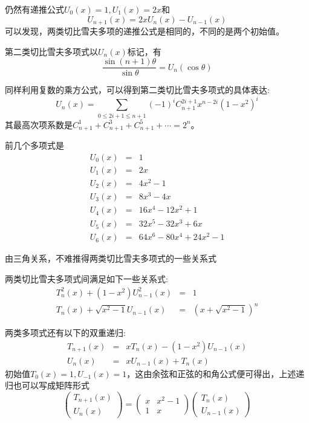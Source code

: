 仍然有递推公式$U_0(x)=1, U_1(x)=2x$和
\begin{equation*}
  U_{n+1}(x)=2xU_n(x)-U_{n-1}(x)
\end{equation*}
可以发现，两类切比雪夫多项的递推公式是相同的，不同的是两个初始值。

第二类切比雪夫多项式以$U_n(x)$标记，有
\begin{equation*}
  \frac{\sin{(n+1)\theta}}{\sin{\theta}} = U_n(\cos{\theta})
\end{equation*}

同样利用复数的乘方公式，可以得到第二类切比雪夫多项式的具体表达:
\begin{equation*}
  U_n(x) = \sum_{0 \leqslant 2i+1 \leqslant n+1}(-1)^iC_{n+1}^{2i+1}x^{n-2i}(1-x^2)^{i}
\end{equation*}
其最高次项系数是$C_{n+1}^1+C_{n+1}^3+C_{n+1}^5+\cdots=2^n$。

前几个多项式是
\begin{eqnarray*}
  U_0(x) & = & 1 \\
  U_1(x) & = & 2x \\
  U_2(x) & = & 4x^2-1 \\
  U_3(x) & = & 8x^3-4x \\
  U_4(x) & = & 16x^4-12x^2+1 \\
  U_5(x) & = & 32x^5-32x^3+6x \\
  U_6(x) & = & 64x^6-80x^4+24x^2-1
\end{eqnarray*}

由三角关系，不难推得两类切比雪夫多项式的一些关系式
\begin{property}
  两类切比雪夫多项式间满足如下一些关系式:
  \begin{eqnarray*}
    T_n^2(x)+(1-x^2)U_{n-1}^2(x) & = & 1 \\
    T_n(x)+\sqrt{x^2-1}U_{n-1}(x) & = & (x+\sqrt{x^2-1})^n
  \end{eqnarray*}
\end{property}

两类多项式还有以下的双重递归:
\begin{eqnarray*}
  T_{n+1}(x) & = & xT_n(x)-(1-x^2)U_{n-1}(x) \\
  U_n(x) & = & xU_{n-1}(x)+T_n(x)
\end{eqnarray*}
初始值$T_0(x)=1, U_{-1}(x)=1$，这由余弦和正弦的和角公式便可得出，上述递归也可以写成矩阵形式
\[
  \begin{pmatrix}
    T_{n+1}(x) \\
    U_n(x)
  \end{pmatrix}
  =
  \begin{pmatrix}
    x & x^2-1 \\
    1 & x
  \end{pmatrix}
  \begin{pmatrix}
    T_n(x) \\
    U_{n-1}(x)
  \end{pmatrix}
  \]

